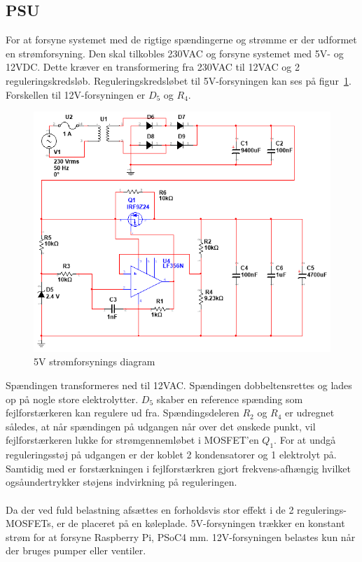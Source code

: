 \subsection{PSU}
For at forsyne systemet med de rigtige spændingerne og strømme er der udformet en strømforsyning. Den skal tilkobles 230VAC og forsyne systemet med 5V- og 12VDC. Dette kræver en transformering fra 230VAC til 12VAC og 2 reguleringskredsløb. Reguleringskredsløbet til 5V-forsyningen kan ses på figur~\ref{photo:PSU_5V}. Forskellen til 12V-forsyningen er $D_5$ og $R_4$.
 
\begin{figure}[H]
	\centering
	\includegraphics[scale=0.75]{Projektbeskrivelse/DesignOgImplementeringAfHW/PSU/PSU_5V}
	\caption{5V strømforsynings diagram}
	\label{photo:PSU_5V}
\end{figure}

Spændingen transformeres ned til 12VAC. Spændingen dobbeltensrettes og lades op på nogle store elektrolytter. $D_5$ skaber en reference spænding som fejlforstærkeren kan regulere ud fra. Spændingsdeleren $R_2$ og $R_4$ er udregnet således, at når spændingen på udgangen når over det ønskede punkt, vil fejlforstærkeren lukke for strømgennemløbet i MOSFET'en $Q_1$. For at undgå reguleringsstøj på udgangen er der koblet 2 kondensatorer og 1 elektrolyt på. Samtidig med er forstærkningen i fejlforstærkren gjort frekvens-afhængig hvilket ogsåundertrykker støjens indvirkning på reguleringen.
\\\\
Da der ved fuld belastning afsættes en forholdsvis stor effekt i de 2 regulerings-MOSFETs, er de placeret på en køleplade. 5V-forsyningen trækker en konstant strøm for at forsyne Raspberry Pi, PSoC4 mm. 12V-forsyningen belastes kun når der bruges pumper eller ventiler.

